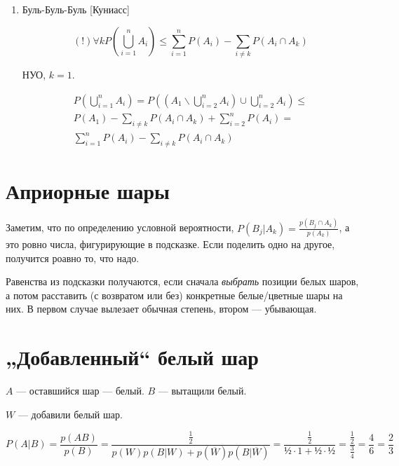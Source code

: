 \documentclass[12pt, a4paper]{article}
\begin{document}
\begin{enumerate}
    \item Буль-Буль-Буль [Куниасс]
    
    \begin{equation}
        (!) \forall k P\left(\bigcup_{i=1}^n A_i\right) \leqslant \sum_{i=1}^n P\left(A_i\right) - \sum_{i \neq k} P\left(A_i \cap A_k\right)
    \end{equation}

    НУО, $k = 1$. 


    \begin{multline}
        P\left(\bigcup_{i=1}^n A_i\right) = P\left(\left(A_1 \backslash \bigcup_{i=2}^n A_i \right) \cup \bigcup_{i=2}^n A_i\right) \leqslant \\
        P(A_1) - \sum_{i \neq k} P\left(A_i \cap A_k\right) + \sum_{i=2}^n P\left(A_i\right) = \\
        \sum_{i=1}^n P\left(A_i\right) - \sum_{i \neq k} P\left(A_i \cap A_k\right)
    \end{multline}
\end{enumerate}

\section{Априорные шары}

Заметим, что по определению условной вероятности, $P(B_j | A_k) = \frac{p(B_j \cap A_k)}{p(A_k)}$,
а это ровно числа, фигурирующие в подсказке. Если поделить одно на другое, получится роавно то, что надо.

Равенства из подсказки получаются, если сначала \textit{выбрать} позиции белых шаров,
а потом расставить (с возвратом или без) конкретные белые/цветные шары на них.
В первом случае вылезает обычная степень, втором — убывающая.


\section{„Добавленный“ белый шар}

$A$ — оставшийся шар — белый.
$B$ — вытащили белый.

$W$ — добавили белый шар.

\begin{equation}
    P(A | B) = \frac{p(AB)}{p(B)} = \frac{\frac{1}{2}}{p(W)p(B | W) + p(\overline{W})p(B | \overline{W})} =
    \frac{\frac{1}{2}}{½ \cdot 1 + ½\cdot ½} = \frac{\frac{1}{2}}{\frac 34} = \frac 46 = \frac 23
\end{equation}
\end{document}
